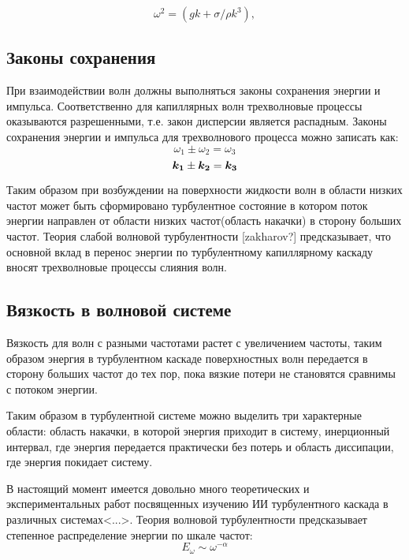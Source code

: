 \begin{equation}
 \label{eq:disperGrav}
\omega^2 = (gk + \sigma/\rho k^3),
\end{equation}



\subsection{Законы сохранения} \label{subsect1_1_2}

При взаимодействии волн должны выполняться законы сохранения энергии и импульса. Соответственно для капиллярных волн трехволновые процессы оказываются разрешенными, т.е. закон дисперсии является распадным. Законы сохранения энергии и импульса для трехволнового процесса можно записать как:
\begin{equation}
 \label{eq:saveOmega}
\omega_1 \pm \omega_2 = \omega_3
\end{equation}
\begin{equation}
 \label{eq:saveK}
\mbox{\boldmath$k_1$} \pm \mbox{\boldmath$k_2$} = \mbox{\boldmath$k_3$}
\end{equation}

Таким образом при возбуждении на поверхности жидкости волн в области низких частот может быть сформировано турбулентное состояние в котором поток энергии направлен от области низких частот(область накачки) в сторону больших частот. Теория слабой волновой турбулентности [zakharov?] предсказывает, что основной вклад в перенос энергии по турбулентному капиллярному каскаду вносят трехволновые процессы слияния волн. 

\subsection{Вязкость в волновой системе} \label{subsect1_1_3}
Вязкость для волн с разными частотами растет с увеличением частоты, таким образом энергия в турбулентном каскаде поверхностных волн передается в сторону больших частот до тех пор, пока вязкие потери не становятся сравнимы с потоком энергии.

Таким образом в турбулентной системе можно выделить три характерные области: область накачки, в которой энергия приходит в систему, инерционный интервал, где энергия передается практически без потерь и область диссипации, где энергия покидает систему. 

В настоящий момент имеется довольно много теоретических и экспериментальных работ посвященных изучению ИИ турбулентного каскада в различных системах<...>. Теория волновой турбулентности предсказывает степенное распределение энергии по шкале частот:
\begin{equation}
E_\omega \sim \omega^{-\alpha}
\end{equation}


